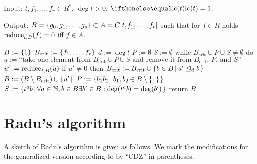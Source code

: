 \documentclass{article}
\begin{document}
\noindent
Input: $t, f_1, \ldots, f_r \in R^*$, $\deg t > 0$, $\lc t = 1$.

\noindent
Output:
$B = \Set{g_0, g_1, \ldots, g_s} \subset A= C[t, f_1, \ldots, f_r]$
such that for $f\in R$ holds $\applyReduce{f}{t}{B} = 0$ iff
$f \in A$.
\begin{pseudoalgorithm}
$B := \Set{1}$
$B_{\mathrm{crit}} := \Set{f_1, \ldots, f_r}$
$d := \deg t$
$P := \emptyset$
$S := \emptyset$
while $B_{\mathrm{crit}} \cup P \cup S \neq \emptyset$ do
    $u := \textrm{``take one element from }B_{\mathrm{crit}} \cup P \cup S\textrm{ and remove it from }B_{\mathrm{crit}}\textrm{, }P\textrm{, and }S\textrm{''}$
    $u' := \applyReduce{u}{t}{B}\label{algo:samba-reduce}$
    if $u' \neq 0$ then
        $B_{\mathrm{crit}} := B_{\mathrm{crit}} \cup \SetDef{b\in B}{\dividesMod[d]{u'}{b}}$
        $B := (B \setminus B_{\mathrm{crit}}) \cup \Set{u'}\label{algo:samba-add}$
        $P := \SetDef{b_1b_2}{b_1,b_2\in B\setminus\Set{1}}$
        $S := \SetDef{t^ab}{\forall a\in\setN,b\in B \exists b'\in B: \deg(t^ab)=\deg(b')}\label{algo:samba-gap}$
return $B$
\end{pseudoalgorithm}







\section{Radu's algorithm}

A sketch of Radu's algorithm \cite{Radu_RamanujanKolberg_2015} is given as
follows. We mark the modifications for the generalized version
according to \cite{ChenDuZhao_FindingModularFunctionsRamanujan_2019}
by ``CDZ'' in parentheses.
\end{document}
